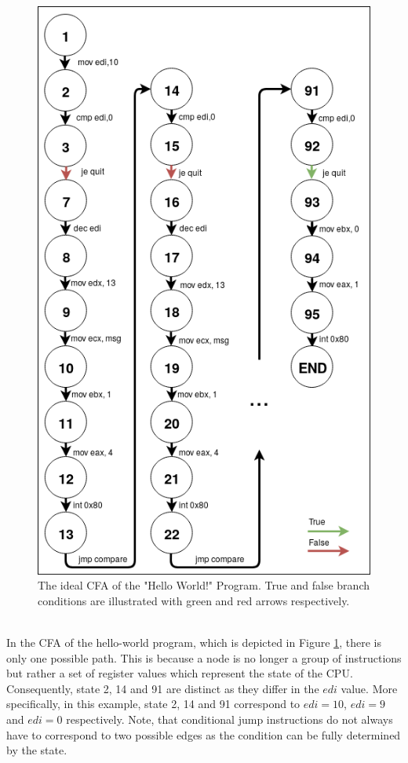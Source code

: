 \documentclass{kththesis}
\begin{document}
\begin{figure}[th]
    \centering
    \includegraphics[scale=0.4]{Images/CFA.png}
    \caption[The ideal CFA of the "Hello World!" Program.]{The ideal CFA of the "Hello World!" Program. True and false branch conditions are illustrated with green and red arrows respectively.}
    \label{fig:HelloCFA}
\end{figure}
\noindent
\\
In the CFA of the hello-world program, which is depicted in Figure \ref{fig:HelloCFA}, there is only one possible path. This is because a node is no longer a group of instructions but rather a set of register values which represent the state of the CPU. Consequently, state 2, 14 and 91 are distinct as they differ in the $edi$ value. More specifically, in this example, state 2, 14 and 91 correspond to $edi=10$, $edi=9$ and $edi=0$ respectively. Note, that conditional jump instructions do not always have to correspond to two possible edges as the condition can be fully determined by the state.
\end{document}
